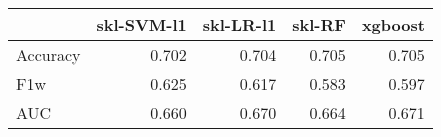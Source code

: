 \begin{tabular}{lrrrr}
\toprule
{} &  skl-SVM-l1 &  skl-LR-l1 &  skl-RF &  xgboost \\
\midrule
Accuracy &       0.702 &      0.704 &   0.705 &    0.705 \\
F1w      &       0.625 &      0.617 &   0.583 &    0.597 \\
AUC      &       0.660 &      0.670 &   0.664 &    0.671 \\
\bottomrule
\end{tabular}
